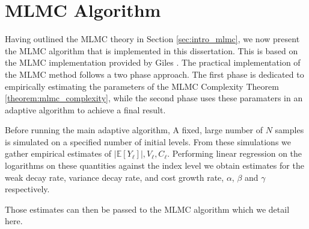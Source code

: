 \section{MLMC Algorithm}

Having outlined the MLMC theory in Section \ref{sec:intro_mlmc}, we now present 
the MLMC algorithm that is implemented in this dissertation. This is 
based on the MLMC implementation provided by Giles \cite{giles2015multilevel}.
The practical implementation of the MLMC method follows a two phase approach.
The first phase is dedicated to empirically estimating the parameters 
of the MLMC Complexity Theorem \ref{theorem:mlmc_complexity}, while the
second phase uses these paramaters in an adaptive algorithm 
to achieve a final result.

Before running the main adaptive algorithm, A fixed, large number of $N$ 
samples is simulated on a specified number of initial levels. From 
these simulations we gather empirical estimates of $|\mathbb{E}[Y_\ell]|, 
V_\ell, C_\ell$. Performing linear regression on the logarithms on these
quantities against the index level we obtain estimates for the weak decay rate,
variance decay rate, and cost growth rate, $\alpha$, $\beta$ and $\gamma$ 
respectively. 

Those estimates can then be passed to the MLMC algorithm which we detail here.

